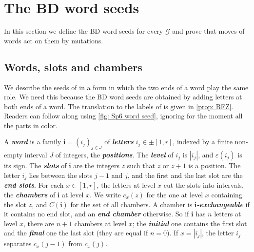 \documentclass[a4paper]{amsart}
\numberwithin{equation}{section}
\theoremstyle{definition}
\theoremstyle{remark}
\newcommand{\mcG}{\mathcal{G}}
\newcommand{\bfi}{\mathbf{i}}
\newcommand{\newword}[1]{\textbf{\emph{#1}}}
\begin{document}
\section{The BD word seeds}
\label{sec: model}
In this section we define the BD word seeds for every $\mcG$ and prove that moves of words act on them by mutations.

\subsection{Words, slots and chambers}
\label{sec: words}
We describe the seeds of \cite[Section~2.2]{BFZ05} in a form in which the two ends of a word play the same role. We need this because the BD word seeds are obtained by adding letters at both ends of a word.
The translation to the labels of \cite{BFZ05} is given in \cref{prop: BFZ}.
Readers can follow along using \cref{fig: Sp6 word seed}, ignoring for the moment all the parts in color.

A \newword{word} is a family $\bfi=(i_j)_{j\in J}$ of \newword{letters} $i_j\in\pm[1,r]$, indexed by a finite non-empty interval $J$ of integers, the \newword{positions}.
  The \newword{level} of $i_j$ is $|i_j|$, and $\varepsilon(i_j)$ is its sign.
The \newword{slots} of $\bfi$ are the integers $z$ such that $z$ or $z+1$ is a position.
  The letter $i_j$ lies between the slots $j-1$ and $j$, and the first and the last slot are the \newword{end slots}.
For each $x\in[1,r]$, the letters at level $x$ cut the slots into intervals, the \newword{chambers} of $\bfi$ at level $x$.
  We write $c_x(z)$ for the one at level $x$ containing the slot $z$, and $C(\bfi)$ for the set of all chambers.
A chamber is \newword{$\bfi$-exchangeable} if it contains no end slot, and an \newword{end chamber} otherwise.
So if $\bfi$ has $n$ letters at level $x$, there are $n+1$ chambers at level $x$; the \newword{initial} one contains the first slot and the \newword{final} one the last slot (they are equal if $n=0$).
If $x=|i_j|$, the letter $i_j$ separates $c_x(j-1)$ from $c_x(j)$.
\end{document}
